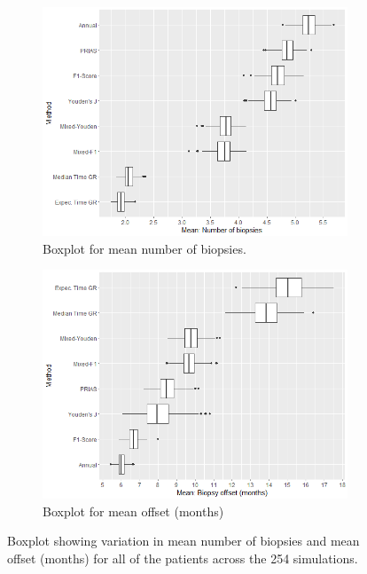 \begin{figure}[!htb]
    \centering
    \captionsetup{justification=centering}
     \begin{subfigure}[b]{0.45\textwidth}
        \includegraphics[width=\textwidth]{images/sim_study/nbMeanBoxPlot_all.png}
        \caption{Boxplot for mean number of biopsies.}
        \label{fig : nbMeanBoxPlot_all}
    \end{subfigure}
    \begin{subfigure}[b]{0.45\textwidth}
        \includegraphics[width=\textwidth]{images/sim_study/offsetMeanBoxPlot_all.png}
        \caption{Boxplot for mean offset (months)}
        \label{fig : offsetMeanBoxPlot_all}
    \end{subfigure}      
    \caption{Boxplot showing variation in mean number of biopsies and mean offset (months) for all of the patients across the 254 simulations.}
\end{figure}

